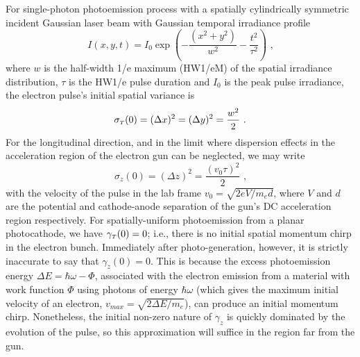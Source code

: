 For single-photon photoemission process with a spatially cylindrically symmetric incident Gaussian laser beam with Gaussian temporal irradiance profile 
\begin{equation}\label{eq:laser_form}
I ( x , y , t ) = I_{0} \exp \left ( - \frac{ ( x^{2} +y^{2} ) }{ w^{2} } - \frac{ t^{ 2 } }{ \tau^{ 2 } } \right ) \text{ ,}
\end{equation}
where $w$ is the half-width 1/e maximum (HW1/eM) of the spatial irradiance distribution, $\tau$ is the HW1/e pulse duration and $I_{0}$ is the peak pulse irradiance, the electron pulse's initial spatial variance is
\begin{equation}
\sigma_{{\scriptscriptstyle T} } ( 0 ) = ( \Delta x )^{2} = ( \Delta y)^{2} = \frac{ w^{2} }{ 2 } \text{ .}
\end{equation}
For the longitudinal direction, and in the limit where dispersion effects in the acceleration region of the electron gun can be neglected, we may write
\begin{equation} \label{eq:initial_sigma_z}
\sigma_{ z } ( 0 ) = ( \Delta z)^{2} = \frac{ ( v_{{ \scriptscriptstyle 0}} \tau )^{2} }{ 2 } \text{ ,}
\end{equation}
with the velocity of the pulse in the lab frame $v_{{ \scriptscriptstyle 0}} = \sqrt{ 2 e V / m_{e} d } $, where $ V $ and $ d $ are the potential and cathode-anode separation of the gun's DC acceleration region respectively.
For spatially-uniform photoemission from a planar photocathode, we have $ \gamma_{{\scriptscriptstyle T}} ( 0 ) = 0 $; i.e., there is no initial spatial momentum chirp in the electron bunch. Immediately after photo-generation, however, it is strictly inaccurate to say that $ \gamma_{ z } ( 0 ) = 0 $.
This is because the excess photoemission energy $ \Delta E = \hbar \omega - \Phi $, associated with the electron emission from a material with work function $\Phi$ using photons of energy $ \hbar \omega $ (which gives the maximum initial velocity of an electron, $ v_{max} = \sqrt{ 2 \Delta E/m_{e} } $), can produce an initial momentum chirp.
Nonetheless, the initial non-zero nature of $ \gamma_{z} $ is quickly dominated by the evolution of the pulse, so this approximation will suffice in the region far from the gun.

